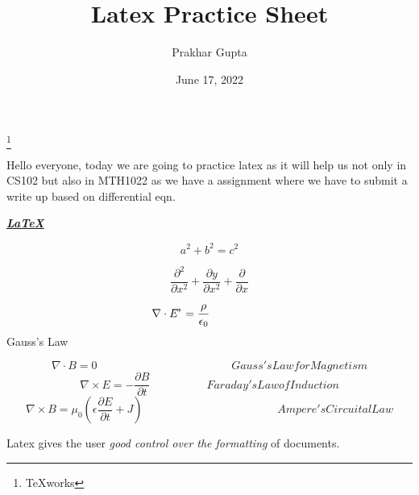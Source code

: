 \documentclass[12pt, letterpaper]{article}
\begin{document}
\title{Latex Practice Sheet}
\author{Prakhar Gupta}
\date{June 17, 2022}
\thanks{TeXworks}
\maketitle
Hello everyone, today we are going to practice latex as it will help us not only in CS102 but also in MTH1022 as we have a assignment where we have to submit a write up based on differential eqn.

\textbf{\underline{\textit{LaTeX}}}

\[ a^2 + b^2 = c^2 \]

\[ \frac{\partial ^2}{\partial x^2} + \frac{\partial y}{\partial x^2} + \frac{\partial}{\partial x} \]

\begin{equation}
\nabla \cdot E\hspace{-0.5em}^\rightarrow = \frac{\rho}{\epsilon_0}\hspace{5em}    
\end{equation}   Gauss's Law

\begin{equation}
\nabla \cdot B = 0	                                                                         \hspace{5cm}              Gauss's Law for Magnetism
\end{equation}   
\begin{equation}
\nabla \times E = -\frac{\partial B}{\partial t}                                  \hspace{5em}    Faraday's Law of Induction
\end{equation}  
\begin{equation} 
\nabla \times B = \mu_0 ( \epsilon \frac{\partial E}{\partial t} + J )  \hspace{5cm} Ampere's Circuital Law
 \end{equation}        
 
 
 Latex gives the user \emph{good control \emph{over the} formatting} of documents.
\end{document}
